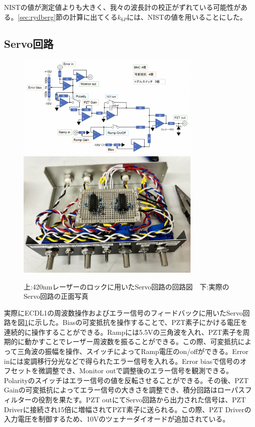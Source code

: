 \documentclass[dvipdfmx]{jsreport}
\begin{document}
NISTの値が測定値よりも大きく、我々の波長計の校正がずれている可能性がある。\ref{sec:rydberg}節の計算に出てくる$k_{6P}$には、NISTの値を用いることにした。

\subsection{Servo回路}

\begin{figure}
\centering
\includegraphics[width=0.8\textwidth]{images/servo.png}
\includegraphics[width=0.8\textwidth]{images/servo_real.jpg}
\caption{\label{fig:servo}上:420nmレーザーのロックに用いたServo回路の回路図　下:実際のServo回路の正面写真}
\end{figure}

実際にECDL1の周波数操作およびエラー信号のフィードバックに用いたServo回路を図\ref{fig:servo}に示した。Biasの可変抵抗を操作することで、PZT素子にかける電圧を連続的に操作することができる。Rampには5.5Vの三角波を入れ、PZT素子を周期的に動かすことでレーザー周波数を振ることができる。この際、可変抵抗によって三角波の振幅を操作、スイッチによってRamp電圧のon/offができる。Error inには変調移行分光などで得られたエラー信号を入れる。Error biasで信号のオフセットを微調整でき、Monitor outで調整後のエラー信号を観測できる。Polarityのスイッチはエラー信号の値を反転させることができる。その後、PZT Gainの可変抵抗によってエラー信号の大きさを調整でき、積分回路はローパスフィルターの役割を果たす。PZT outにてServo回路から出力された信号は、PZT Driverに接続され15倍に増幅されてPZT素子に送られる。この際、PZT Driverの入力電圧を制御するため、10Vのツェナーダイオードが追加されている。
\end{document}
